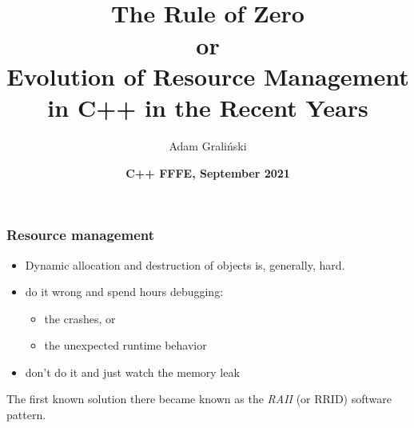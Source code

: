 \documentclass[aspectratio=169]{beamer}
\title[Friends09 ::The Rule Of ...]{The Rule of \xcancel{Big Three}\textsuperscript{\cancel{and a half}} \xcancel{Five} \cancel{Four\textsuperscript{and a half}} \xcancel{Seven} Zero\\
or\\
Evolution of Resource Management in C++ in the Recent Years
}
\author{Adam Graliński}
\date[FFFE\_21]{\textbf{C++ {\color{red}F}{\color{blue}F}{\color{green}F}{\color{yellow}E}, September 2021}}
\newcommand{\greenemph}[1]{\textit{\textcolor{clGreen}{#1}}}
\begin{document}
{
\begin{frame}
\titlepage{}
\end{frame}
}

\begin{frame}
\frametitle{Resource management}
\begin{itemize}
\item{Dynamic allocation and destruction of objects is, generally, hard.}
\item{do it wrong and spend hours debugging:}
\begin{itemize}
  \item{the \textcolor{clGreen}{crashes}, or}
  \item{the \textcolor{clOrange}{unexpected runtime behavior}}
\end{itemize}
\item{don't do it and just \textcolor{clRedFlag}{watch the memory leak}}
\end{itemize}
\vspace{1cm}
The first known solution there became known as the \greenemph{RAII} (or RRID) software pattern.
\end{frame}
\end{document}
